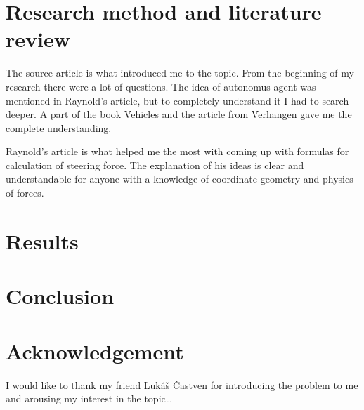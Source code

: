 \documentclass[10pt,twoside,english,a4paper]{article}
\begin{document}
\section{Research method and literature review} \label{research method} 

The source article \cite{Raynolds} is what introduced me to the topic. 
From the beginning of my research there were a lot of questions. 
The idea of autonomus agent was mentioned in Raynold's article,
but to completely understand it I had to search deeper. A part of the book Vehicles 
\cite{Braitenberg} and the article from Verhangen \cite{Verhagen} gave me the complete
understanding.

Raynold's article is what helped me the most with coming up with formulas for
calculation of steering force. The explanation of his ideas is clear and 
understandable for anyone with a knowledge of coordinate geometry 
and physics of forces. 

\section{Results} \label{results} 


\section{Conclusion} \label{conclusion} 

\section*{Acknowledgement}
I would like to thank my friend Lukáš Častven for introducing 
the problem to me and arousing my interest in the topic\ldots


 
\end{document}
